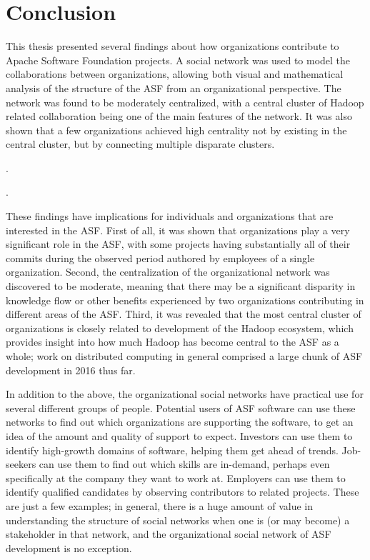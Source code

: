 \chapter{Conclusion}
This thesis presented several findings about how organizations contribute to Apache Software Foundation projects. A social network was used to model the collaborations between organizations, allowing both visual and mathematical analysis of the structure of the ASF from an organizational perspective. The network was found to be moderately centralized, with a central cluster of Hadoop related collaboration being one of the main features of the network. It was also shown that a few organizations achieved high centrality not by existing in the central cluster, but by connecting multiple disparate clusters.

. 

. 

These findings have implications for individuals and organizations that are interested in the ASF. First of all, it was shown that organizations play a very significant role in the ASF, with some projects having substantially all of their commits during the observed period authored by employees of a single organization. Second, the centralization of the organizational network was discovered to be moderate, meaning that there may be a significant disparity in knowledge flow or other benefits experienced by two organizations contributing in different areas of the ASF. Third, it was revealed that the most central cluster of organizations is closely related to development of the Hadoop ecosystem, which provides insight into how much Hadoop has become central to the ASF as a whole; work on distributed computing in general comprised a large chunk of ASF development in 2016 thus far.

In addition to the above, the organizational social networks have practical use for several different groups of people. Potential users of ASF software can use these networks to find out which organizations are supporting the software, to get an idea of the amount and quality of support to expect. Investors can use them to identify high-growth domains of software, helping them get ahead of trends. Job-seekers can use them to find out which skills are in-demand, perhaps even specifically at the company they want to work at. Employers can use them to identify qualified candidates by observing contributors to related projects. These are just a few examples; in general, there is a huge amount of value in understanding the structure of social networks when one is (or may become) a stakeholder in that network, and the organizational social network of ASF development is no exception.

